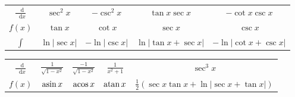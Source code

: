 \newcommand*{\dif}{\mathop{}\!\mathrm{d}}

\noindent
\begin{tabular}{c c c c c}
    $\frac{\dif}{\dif x}$ &
    $\sec^2 x$ & $-\csc^2 x$ &
    $\tan x \sec x$ & $-\cot x \csc x$ \\

    $f(x)$ &
    $\tan x$ & $\cot x$ &
    $\sec x$ & $\csc x$ \\

    $\int$ &
    $\ln \left|\sec x\right|$ & $-\ln \left|\csc x\right|$ &
    $\ln \left|\tan x + \sec x\right|$ & $-\ln \left|\cot x + \csc x\right|$ \\
\end{tabular}

\vspace{5pt}

\noindent
\begin{tabular}{c c c c c}
    $\frac{\dif}{\dif x}$ &
    $\frac{1}{\sqrt{1 - x^2}}$ & $\frac{-1}{\sqrt{1 - x^2}}$ & $\frac{1}{x^2 + 1}$ &
    $\sec^3 x$ \\

    $f(x)$ &
    $\operatorname{asin} x$ & $\operatorname{acos} x$ & $\operatorname{atan} x$ &
    $\frac{1}{2} \left(\sec x \tan x + \ln \left| \sec x + \tan x \right|\right)$ \\
\end{tabular}


